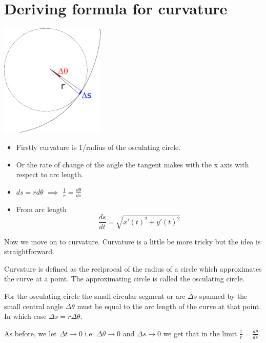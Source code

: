 \documentclass[]{article} %
\theoremstyle{definition}
\theoremstyle{theorem}
\begin{document}
\section{Deriving formula for curvature}
\begin{tcolorbox}
	\begin{minipage}{\linewidth}
	\centering
		\centering
		\includegraphics[width=50mm, scale=0.4]{curvature_illustration.png}
	\end{minipage}
	\begin{itemize}
		\item Firstly curvature is 1/radius of the osculating circle.
		\item Or the rate of change of the angle the tangent makes with the x axis with respect to arc length.
		\item $ds=rd\theta$ $\implies$ $\frac{1}{r}=\frac{d\theta}{ds}$	
		\item From arc length 
		\begin{equation} \label{eq:1}
			\frac{ds}{dt} = \sqrt{x'(t)^2+y'(t)^2} 
		\end{equation}
	\end{itemize}
\end{tcolorbox}

Now we move on to curvature. Curvature is a little be more tricky but the idea is straightforward.

Curvature is defined as the reciprocal of the radius of a circle which approximates the curve at a point. The approximating circle is called the osculating circle.

For the osculating circle the small circular segment or arc $\Delta s$ spanned by the small central angle $\Delta \theta$ must be equal to the arc length of the curve at that point. In which case $\Delta s = r \Delta \theta$.

As before, we let $\Delta t \to 0$ i.e. $\Delta \theta \to 0$ and $\Delta s \to 0$ we get that in the limit $\frac{1}{r}=\frac{d\theta}{ds}$.
\end{document}
